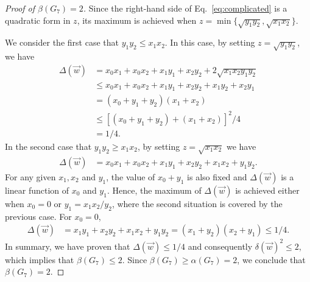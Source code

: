 \begin{proof}[Proof of $\beta(G_7)=2$]
Since the right-hand side of Eq.~\eqref{eq:complicated} is a quadratic form in $z$, its maximum is achieved when $z = \min \{\sqrt{y_1 y_2}, \sqrt{x_1x_2} \}$.

We consider the first case that  $y_1 y_2 \leq x_1 x_2$. In this case, by setting $z = \sqrt{y_1y_2}$, we have
\begin{align}
     \Delta(\vec{w}) &= x_0 x_1+ x_0 x_2 + x_1 y_1 + x_2 y_2 + 2\sqrt{x_1 x_2 y_1 y_2}\nonumber\\
     &\le x_0 x_1+ x_0 x_2 + x_1 y_1 + x_2 y_2 + x_1 y_2 + x_2 y_1\nonumber\\
     &= (x_0 + y_1 + y_2)(x_1 + x_2)\nonumber\\
     &\le [(x_0 + y_1 + y_2) + (x_1 + x_2)]^2/4\nonumber\\
     &=1/4.
\end{align}
In the second case that  $y_1 y_2 \geq x_1 x_2$, by setting $z = \sqrt{x_1x_2}$ we have
\begin{align}
     \Delta(\vec{w}) &= x_0 x_1+ x_0 x_2 + x_1 y_1 + x_2 y_2 + x_1 x_2 + y_1 y_2.
\end{align}
For any given $x_1, x_2$ and $y_1$, the value of $x_0 + y_1$ is also fixed and $\Delta(\vec{w})$ is a linear function of $x_0$ and $y_1$. Hence, the maximum of $\Delta(\vec{w})$ is achieved either when $x_0 = 0$ or $y_1=x_1x_2/y_2$, where the second situation is covered by the previous case. For $x_0 = 0$, 
\begin{align}
     \Delta(\vec{w}) &= x_1 y_1 + x_2 y_2 + x_1 x_2 + y_1 y_2 = (x_1 + y_2) (x_2 + y_1)  \le 1/4.
\end{align}
In summary, we have proven that $\Delta(\vec{w}) \le 1/4$ and consequently $\delta(\vec{w})^2 \le 2$, which implies that $\beta(G_7) \le 2$. Since $\beta(G_7) \ge \alpha(G_7) = 2$, we conclude that $\beta(G_7) = 2$.
\end{proof}
